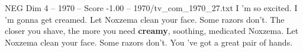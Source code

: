 \begin{textsample}{NEG Dim 4 – 1970 – Score -1.00 – 1970/tv\_com\_1970\_27.txt}  \label{ex:f4_neg_058}
I 'm so excited.
I 'm gonna get creamed.
Let Noxzema clean your face.
Some razors don't.
The closer you shave, the more you need \textbf{creamy}, soothing, medicated Noxzema.
Let Noxzema clean your face.
Some razors don't.
You 've got a great pair of hands.

\end{textsample}
